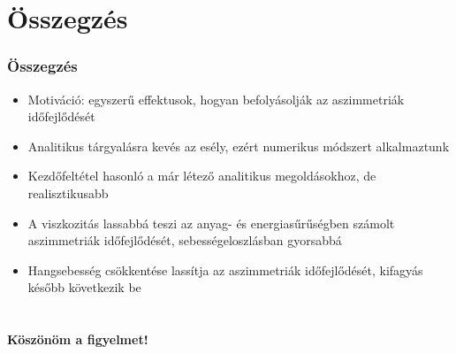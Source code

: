\documentclass{beamer}
\begin{document}
\section{Összegzés}
\begin{frame}
\frametitle{Összegzés}
\begin{itemize}
\setlength{\itemsep}{16pt}
\item<1-> Motiváció: egyszerű effektusok, hogyan befolyásolják az aszimmetriák időfejlődését
\item<2-> Analitikus tárgyalásra kevés az esély, ezért numerikus módszert alkalmaztunk
\item<3-> Kezdőfeltétel hasonló a már létező analitikus megoldásokhoz, de realisztikusabb
\item<4-> A viszkozitás lassabbá teszi az anyag- és energiasűrűségben számolt aszimmetriák időfejlődését, sebességeloszlásban gyorsabbá
\item<5-> Hangsebesség csökkentése lassítja az aszimmetriák időfejlődését, kifagyás később következik be
\end{itemize}
\end{frame}

\section{}
\begin{frame}
\begin{center}
\textbf{\huge{Köszönöm a figyelmet!}}
\end{center}
\end{frame}
\end{document}
